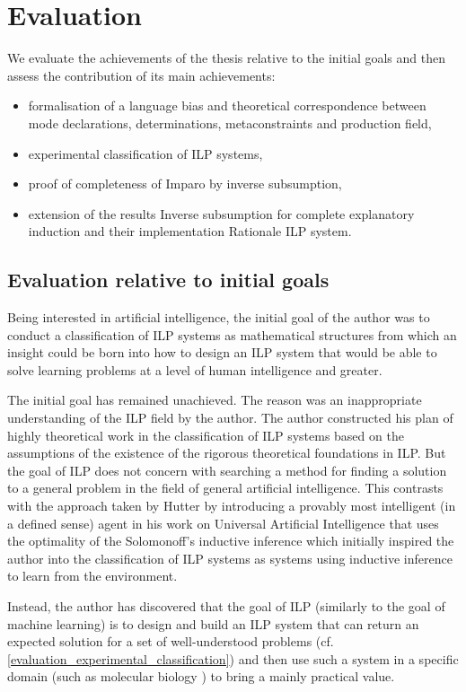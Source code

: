 \chapter{Evaluation}\label{ch:evaluation}
We evaluate the achievements of the thesis relative to the initial goals and then assess the contribution of its main achievements:
\begin{itemize}
\item formalisation of a language bias and theoretical correspondence between mode declarations, determinations, metaconstraints and production field,
\item experimental classification of ILP systems,
\item proof of completeness of Imparo by inverse subsumption,
\item extension of the results Inverse subsumption for complete explanatory induction and their implementation Rationale ILP system.
\end{itemize}

\section{Evaluation relative to initial goals}
Being interested in artificial intelligence, the initial goal of the author was to conduct a classification of ILP systems as mathematical structures from which an insight could be born into how to design an ILP system that would be able to solve learning problems at a level of human intelligence and greater.

The initial goal has remained unachieved. The reason was an inappropriate understanding of the ILP field by the author. The author constructed his plan of highly theoretical work in the classification of ILP systems based on the assumptions of the existence of the rigorous theoretical foundations in ILP. But the goal of ILP does not concern with searching a method for finding a solution to a general problem in the field of general artificial intelligence. This contrasts with the approach taken by Hutter by introducing a provably most intelligent (in a defined sense) agent in his work on Universal Artificial Intelligence \cite{hutter2005universal}
that uses the optimality of the Solomonoff's inductive inference 
\cite{solomonoff1964formal}\cite{legg1997solomonoff} which initially inspired the author into the classification of ILP systems as systems using inductive inference to learn from the environment.

Instead, the author has discovered that the goal of ILP (similarly to the goal of machine learning) is to design and build an ILP system that can return an expected solution for a set of well-understood problems (cf. \ref{evaluation_experimental_classification}) and then use such a system in a specific domain (such as molecular biology \cite{srinivasan1994mutagenesis}\cite{srinivasan1997carcinogenesis}) to bring a mainly practical value.

